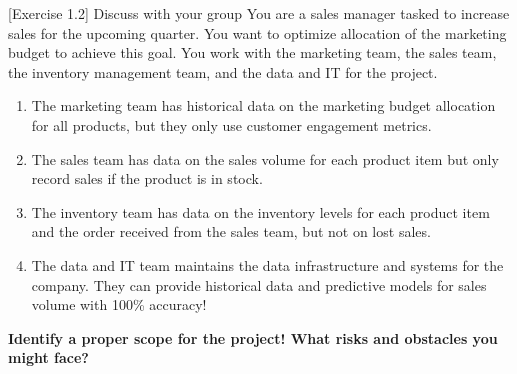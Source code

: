 \documentclass [xcolor=svgnames, handout]{beamer}
\begin{document}
\begin{frame}{[Exercise 1.2] Discuss with your group}
    You are a sales manager tasked to increase sales for the upcoming quarter. You want to optimize allocation of the marketing budget to achieve this goal. You work with the marketing team, the sales team, the inventory management team, and the data and IT for the project.
    
    \begin{enumerate}
        \item The marketing team has historical data on the marketing budget allocation for all products, but they only use customer engagement metrics.
        \item The sales team has data on the sales volume for each product item but only record sales if the product is in stock.
        \item The inventory team has data on the inventory levels for each product item and the order received from the sales team, but not on lost sales.
        \item The data and IT team maintains the data infrastructure and systems for the company. They can provide historical data and predictive models for sales volume with 100\% accuracy!
    \end{enumerate}
    
    \textbf{Identify a proper scope for the project! What risks and obstacles you might face?}
\end{frame}
\end{document}
